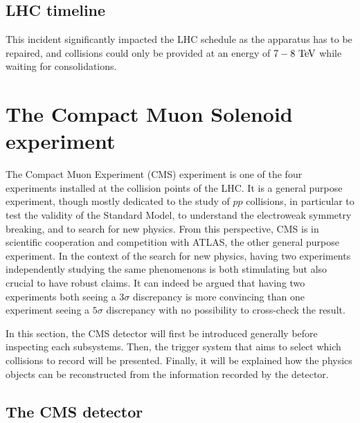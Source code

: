 
    \subsection{LHC timeline}

    This incident significantly
    impacted the LHC schedule as the apparatus has to be repaired, and collisions could
    only be provided at an energy of $7-8~\text{TeV}$ while waiting for consolidations.

    \section{The Compact Muon Solenoid experiment}

        The Compact Muon Experiment (CMS) experiment is one of the four experiments installed
        at the collision points of the LHC. It is a general purpose experiment, though mostly dedicated
        to the study of $pp$ collisions, in particular to test the validity of the Standard
        Model, to understand the electroweak symmetry breaking, and to search for new physics. From this
        perspective, CMS is in scientific cooperation and competition with ATLAS, the
        other general purpose experiment. In the context of the search for new physics,
        having two experiments independently studying the same phenomenons is both
        stimulating but also crucial to have robust claims. It can indeed be argued that
        having two experiments both seeing a $3\sigma$ discrepancy is more convincing than
        one experiment seeing a $5\sigma$ discrepancy with no possibility to cross-check
        the result.

        In this section, the CMS detector will first be introduced generally before inspecting
        each subsystems. Then, the trigger system that aims to select which collisions to
        record will be presented. Finally, it will be explained how the physics objects
        can be reconstructed from the information recorded by the detector.

        \subsection{The CMS detector}

